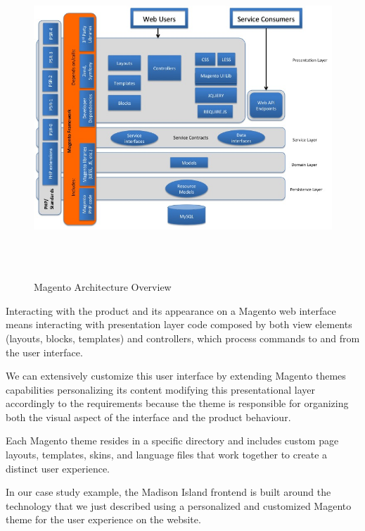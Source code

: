 \vspace{0.5cm}
\begin{figure}[H]
  \centering
    \includegraphics[height=12cm]{images/magento/magento-architecture.jpg}
  \caption{Magento Architecture Overview}
  \label{fig:magento-architecture-overview}
\end{figure}
\vspace{0.5cm}

Interacting with the product and its appearance on a Magento web interface means interacting with presentation layer code composed by both view elements (layouts, blocks, templates) and controllers, which process commands to and from the user interface. 

We can extensively customize this user interface by extending Magento themes capabilities personalizing its content modifying this presentational layer accordingly to the requirements because the theme is responsible for organizing both the visual aspect of the interface and the product behaviour.

Each Magento theme resides in a specific directory and includes custom page layouts, templates, skins, and language files that work together to create a distinct user experience.

In our case study example, the Madison Island frontend is built around the technology that we just described using a personalized and customized Magento theme for the user experience on the website. 

